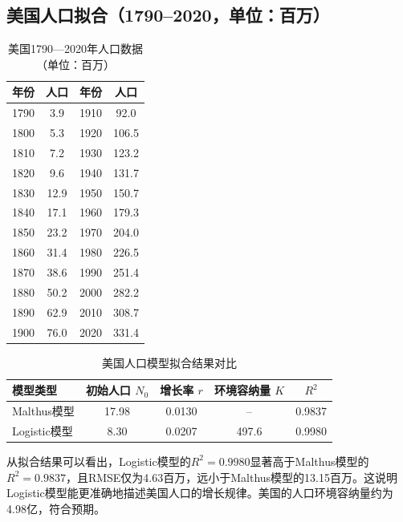 \documentclass{article}
\begin{document}
	\subsection{美国人口拟合（1790--2020，单位：百万）}
	\begin{table}[htbp]
		\centering
		\caption{美国1790—2020年人口数据（单位：百万）}
		\renewcommand{\arraystretch}{1.2}
		\renewcommand{\heavyrulewidth}{1.2pt}
		\setlength{\tabcolsep}{3em}
		\begin{tabular}{cccc}
			\toprule
			年份 & 人口 & 年份 & 人口 \\
			\midrule
			1790 & 3.9  & 1910 & 92.0  \\
			1800 & 5.3  & 1920 & 106.5 \\
			1810 & 7.2  & 1930 & 123.2 \\
			1820 & 9.6  & 1940 & 131.7 \\
			1830 & 12.9 & 1950 & 150.7 \\
			1840 & 17.1 & 1960 & 179.3 \\
			1850 & 23.2 & 1970 & 204.0 \\
			1860 & 31.4 & 1980 & 226.5 \\
			1870 & 38.6 & 1990 & 251.4 \\
			1880 & 50.2 & 2000 & 282.2 \\
			1890 & 62.9 & 2010 & 308.7 \\
			1900 & 76.0 & 2020 & 331.4 \\
			\bottomrule
		\end{tabular}
		\renewcommand{\heavyrulewidth}{0.8pt}
	\end{table}
	
	\begin{table}[htbp]
		\centering
		\setlength{\tabcolsep}{8pt}
		\renewcommand{\arraystretch}{1.3}
		\caption{美国人口模型拟合结果对比}
		\label{tab:usa_pop_fit}
		\begin{tabular}{lcccc}
			\toprule
			\textbf{模型类型} & \textbf{初始人口 }\(N_0\) & \textbf{增长率 }\(r\) & \textbf{环境容纳量 }\(K\) & \textbf{\(R^2\)} \\
			\midrule
			Malthus模型 & 17.98 & 0.0130 & -- & 0.9837 \\
			Logistic模型 & 8.30 & 0.0207 & 497.6 & 0.9980 \\
			\bottomrule
		\end{tabular}
	\end{table}
	
	从拟合结果可以看出，Logistic模型的\(R^2=0.9980\)显著高于Malthus模型的\(R^2=0.9837\)，且RMSE仅为4.63百万，远小于Malthus模型的13.15百万。这说明Logistic模型能更准确地描述美国人口的增长规律。美国的人口环境容纳量约为4.98亿，符合预期。
	
\end{document}
